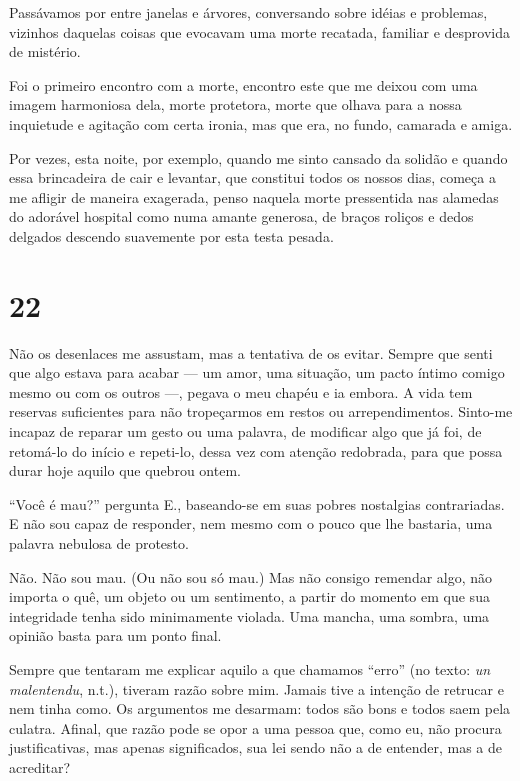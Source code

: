 Passávamos por entre janelas e árvores, conversando sobre idéias e
problemas, vizinhos daquelas coisas que evocavam uma morte recatada,
familiar e desprovida de mistério.

Foi o primeiro encontro com a morte, encontro este que me deixou com uma
imagem harmoniosa dela, morte protetora, morte que olhava para a nossa
inquietude e agitação com certa ironia, mas que era, no fundo, camarada
e amiga.

Por vezes, esta noite, por exemplo, quando me sinto cansado da solidão e
quando essa brincadeira de cair e levantar, que constitui todos os
nossos dias, começa a me afligir de maneira exagerada, penso naquela
morte pressentida nas alamedas do adorável hospital como numa amante
generosa, de braços roliços e dedos delgados descendo suavemente por
esta testa pesada.

\section{22}

Não os desenlaces me assustam, mas a tentativa de os evitar. Sempre que
senti que algo estava para acabar --- um amor, uma situação, um pacto
íntimo comigo mesmo ou com os outros ---, pegava o meu chapéu e ia embora.
A vida tem reservas suficientes para não tropeçarmos em restos ou
arrependimentos. Sinto-me incapaz de reparar um gesto ou uma palavra, de
modificar algo que já foi, de retomá-lo do início e repeti-lo, dessa vez
com atenção redobrada, para que possa durar hoje aquilo que quebrou
ontem.

``Você é mau?'' pergunta E., baseando-se em suas pobres nostalgias
contrariadas. E não sou capaz de responder, nem mesmo com o pouco que
lhe bastaria, uma palavra nebulosa de protesto.

Não. Não sou mau. (Ou não sou só mau.) Mas não consigo remendar algo,
não importa o quê, um objeto ou um sentimento, a partir do momento em
que sua integridade tenha sido minimamente violada. Uma mancha, uma
sombra, uma opinião basta para um ponto final.

Sempre que tentaram me explicar aquilo a que chamamos ``erro'' (no
texto: \emph{un malentendu}, n.t.), tiveram razão sobre mim. Jamais tive
a intenção de retrucar e nem tinha como. Os argumentos me desarmam:
todos são bons e todos saem pela culatra. Afinal, que razão pode se opor
a uma pessoa que, como eu, não procura justificativas, mas apenas
significados, sua lei sendo não a de entender, mas a de acreditar?

